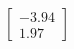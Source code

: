 \documentclass[preview]{standalone}
\begin{document}
\begin{align*}
\begin{bmatrix} -3.94 \\ 1.97 \end{bmatrix}
\end{align*}
\end{document}

